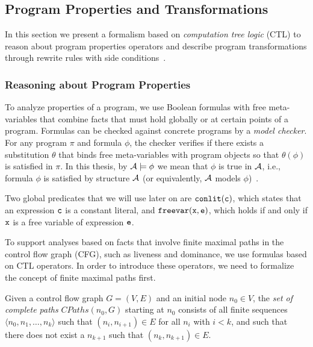 \subsection{Program Properties and Transformations}
\label{ss:osr-reasoning-and-transformations}

In this section we present a formalism based on {\em computation tree logic} (CTL) to reason about program properties operators and describe program transformations through rewrite rules with side conditions~\cite{Clarke86,Lacey04,Kalvala09}.

\subsubsection*{Reasoning about Program Properties}

To analyze properties of a program, we use Boolean formulas with free meta-variables that combine facts that must hold globally or at certain points of a program. Formulas can be checked against concrete programs by a {\em model checker}. For any program $\pi$ and formula $\phi$, the checker verifies if there exists a substitution $\theta$ that binds free meta-variables with program objects so that $\theta(\phi)$ is satisfied in $\pi$. 
In this thesis, by $\cal{A}\models \phi$ we mean that $\phi$ is true in $\cal{A}$, i.e., formula $\phi$ is satisfied by structure $\cal{A}$ (or equivalently, $\cal{A}$ models $\phi$)~\cite{Clarke86}. %

Two global predicates that we will use later on are ${\tt conlit}(\text{${\tt c}$})$, which states that an expression $\text{${\tt c}$}$ is a constant literal, and ${\tt freevar}(\text{${\tt x}$},\text{${\tt e}$})$, which holds if and only if $\text{${\tt x}$}$ is a free variable of expression $\text{${\tt e}$}$.

To support analyses based on facts that involve finite maximal paths in the control flow graph (CFG), such as liveness and dominance, we use formulas based on CTL operators. In order to introduce these operators, we need to formalize the concept of finite maximal paths first.

\begin{definition} Given a control flow graph $G=(V,E)$ and an initial node $n_0\in V$, the {\em set of complete paths} $CPaths(n_0,G)$ starting at $n_0$ consists of all finite sequences $\langle n_0,n_1,\ldots,n_k\rangle$ such that $(n_i,n_{i+1})\in E$ for all $n_i$ with $i<k$, and such that there does not exist a $n_{k+1}$ such that $(n_k,n_{k+1})\in E$.
\end{definition}

